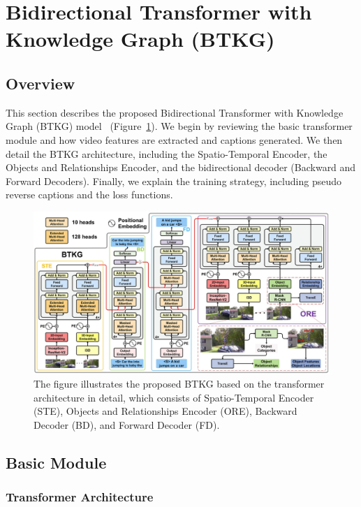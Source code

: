 \section{Bidirectional Transformer with Knowledge Graph (BTKG)}
\label{sec:archi}

\subsection{Overview}

This section describes the proposed Bidirectional Transformer with Knowledge Graph (BTKG) model~\cite{btkg} (Figure~\ref{fig:archi}). We begin by reviewing the basic transformer module and how video features are extracted and captions generated. We then detail the BTKG architecture, including the Spatio-Temporal Encoder, the Objects and Relationships Encoder, and the bidirectional decoder (Backward and Forward Decoders). Finally, we explain the training strategy, including pseudo reverse captions and the loss functions.

\begin{figure}[H]
    \centering
    \includegraphics[width=1\linewidth]{image/archi.jpg}
    \caption{The figure illustrates the proposed BTKG based on the transformer architecture in detail, which consists of Spatio-Temporal Encoder (STE), Objects and Relationships Encoder (ORE), Backward Decoder (BD), and Forward Decoder (FD).}
    \label{fig:archi}
\end{figure}

\subsection{Basic Module}

\subsubsection{Transformer Architecture}

